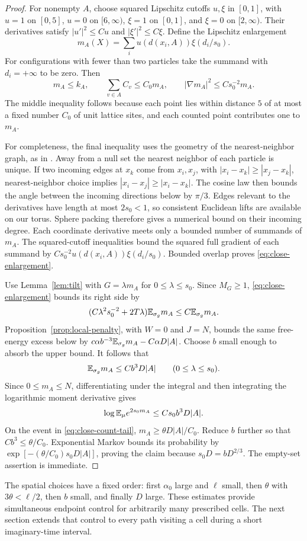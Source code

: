\begin{proof}
For nonempty $A$, choose squared Lipschitz cutoffs $u,\xi$ in
$[0,1]$, with $u=1$ on $[0,5]$, $u=0$ on $[6,\infty)$,
$\xi=1$ on $[0,1]$, and $\xi=0$ on $[2,\infty)$.
Their derivatives satisfy $|u'|^2\le Cu$ and
$|\xi'|^2\le C\xi$. Define the Lipschitz enlargement
\[
 m_A(X)=\sum_i u(d(x_i,A))\xi(d_i/s_0).
\]
For configurations with fewer than two particles take the summand
with $d_i=+\infty$ to be zero. Then
\begin{equation}\label{eq:close-enlargement}
 m_A\le k_A,\qquad
 \sum_{v\in A}C_v\le C_0m_A,\qquad
 |\nabla m_A|^2\le Cs_0^{-2}m_A.
\end{equation}
The middle inequality follows because each point lies within distance
$5$ of at most a fixed number $C_0$ of unit lattice sites, and each
counted point contributes one to $m_A$.

For completeness, the final inequality uses the geometry of the
nearest-neighbor graph, as in
\citet[Section~3, ``Joint count and close-neighbor tails'']{HS}.
Away from a null set the nearest neighbor of each particle is unique.
If two incoming edges at $x_k$ come from $x_i,x_j$, with
$|x_i-x_k|\ge|x_j-x_k|$, nearest-neighbor choice implies
$|x_i-x_j|\ge|x_i-x_k|$. The cosine law then bounds the angle
between the incoming directions below by $\pi/3$. Edges relevant
to the derivatives have length at most $2s_0<1$, so consistent
Euclidean lifts are available on our torus. Sphere packing therefore
gives a numerical bound on their incoming degree. Each coordinate
derivative meets only a bounded number of summands of $m_A$.
The squared-cutoff inequalities bound the squared full gradient of
each summand by
$Cs_0^{-2}u(d(x_i,A))\xi(d_i/s_0)$.
Bounded overlap proves \eqref{eq:close-enlargement}.

Use Lemma~\ref{lem:tilt} with $G=\lambda m_A$ for
$0\le\lambda\le s_0$. Since $M_G\ge1$,
\eqref{eq:close-enlargement} bounds its right side by
\[
 (C\lambda^2s_0^{-2}+2T\lambda)\mathbb E_{\sigma_g}m_A
 \le C\mathbb E_{\sigma_g}m_A.
\]
Proposition~\ref{prop:local-penalty}, with $W=0$ and $J=N$,
bounds the same free-energy excess below by
$c\alpha b^{-3}\mathbb E_{\sigma_g}m_A-C\alpha D|A|$.
Choose $b$ small enough to absorb the upper bound. It follows that
\[
 \mathbb E_{\sigma_g}m_A\le Cb^3D|A|
       \qquad(0\le\lambda\le s_0).
\]
Since $0\le m_A\le N$, differentiating under the integral and then
integrating the logarithmic moment derivative gives
\[
 \log\mathbb E_\mu e^{2s_0m_A}\le Cs_0b^3D|A|.
\]
On the event in \eqref{eq:close-count-tail},
$m_A\ge\theta D|A|/C_0$. Reduce $b$ further so that
$Cb^3\le\theta/C_0$. Exponential Markov bounds its probability
by $\exp[-(\theta/C_0)s_0D|A|]$, proving the claim because
$s_0D=bD^{2/3}$. The empty-set assertion is immediate.
\end{proof}

The spatial choices have a fixed order: first $\alpha_0$ large and
$\ell$ small, then $\theta$ with $3\theta<\ell/2$, then $b$
small, and finally $D$ large. These estimates provide simultaneous
endpoint control for arbitrarily many prescribed cells. The next section
extends that control to every path visiting a cell during a short
imaginary-time interval.
